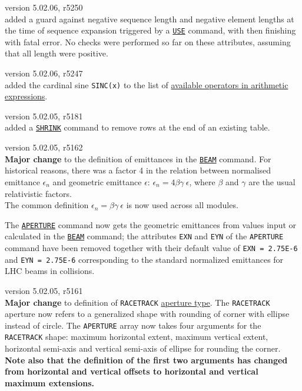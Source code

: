 \begin{madlist}
   version 5.02.06, r5250\\
  added a guard against negative sequence length and negative 
  element lengths at the time of sequence expansion triggered 
  by a \hyperref[sec:use]{\tt USE} command, with \madx then 
  finishing with fatal error. No checks were performed so far 
  on these attributes, assuming that all length were positive.

   version 5.02.06, r5247\\
  added the cardinal sine {\tt SINC(x)} to the list of 
  \hyperref[subsec:operator]{available operators in arithmetic 
  expressions}.

   version 5.02.05, r5181\\
  added a \hyperref[sec:shrink]{\tt SHRINK} command to remove 
  rows at the end of an existing table.

   version 5.02.05, r5162\\
  {\bf Major change} to the definition of emittances in the 
  \hyperref[chap:beam]{\tt BEAM} command. For historical reasons, 
  there was a factor 4 in the relation between normalised emittance 
  $\epsilon_n$ and geometric emittance $\epsilon$: 
  $\epsilon_n = 4 \beta \gamma \ \epsilon$, where $\beta$ and 
  $\gamma$ are the usual relativistic factors. \\
  The common definition $\epsilon_n = \beta \gamma \ \epsilon$ 
  is now used across all \madx modules.
  
  The \hyperref[sec:aperture]{\tt APERTURE} command now gets the 
  geometric emittances from values input or calculated in the 
  \hyperref[chap:beam]{\tt BEAM} command; the attributes {\tt EXN} 
  and {\tt EYN} of the {\tt APERTURE} command have been removed 
  together with their default value of {\tt EXN = 2.75E-6} and 
  {\tt EYN = 2.75E-6} corresponding to the standard normalized 
  emittances for LHC beams in collisions. 
  

   version 5.02.05, r5161\\
  {\bf Major change} to definition of {\tt RACETRACK} 
  \hyperref[sec:def_aper]{aperture type}. 
  The {\tt RACETRACK} aperture now refers to a generalized shape 
  with rounding of corner with ellipse instead of circle. 
  The {\tt APERTURE} array now takes four arguments for the 
  {\tt RACETRACK} shape: maximum horizontal extent, maximum 
  vertical extent, horizontal semi-axis and vertical semi-axis 
  of ellipse for rounding the corner. \\
  {\bf Note also that the definition of the first two arguments 
  has changed from horizontal and vertical offsets to horizontal 
  and vertical maximum extensions.}


\end{madlist}
